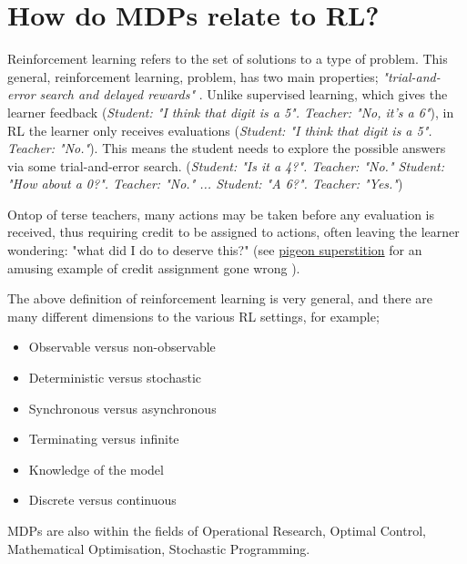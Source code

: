 \hypertarget{how-do-mdps-relate-to-rl}{%
\section{How do MDPs relate to RL?}\label{how-do-mdps-relate-to-rl}}

Reinforcement learning refers to the set of solutions to a type of problem.
This general, reinforcement learning, problem, has two main properties;
\textit{"trial-and-error search and delayed rewards"} \cite{Sutton2018}.
Unlike supervised learning, which gives the learner feedback (\textit{Student: "I think that digit
is a 5". Teacher: "No, it's a 6"}), in RL the learner only receives evaluations (\textit{Student: "I think
that digit is a 5". Teacher: "No."}). This means the student needs to explore the possible answers via some trial-and-error search.
(\textit{Student: "Is it a 4?". Teacher: "No." Student: "How about a 0?". Teacher: "No." ... Student: "A 6?". Teacher: "Yes."})

Ontop of terse teachers, many actions may be taken
before any evaluation is received, thus requiring credit to be assigned to actions,
often leaving the learner wondering: "what did I do to deserve this?" (see
\href{https://www.youtube.com/watch?v=Qv4H81gEGDQ}{pigeon superstition} for an amusing
example of credit assignment gone wrong \cite{Box1997}).


The above definition of reinforcement learning is very general, and there are many
different dimensions to the various RL settings, for example;

\begin{itemize}
\tightlist
\item
  Observable versus non-observable
\item
  Deterministic versus stochastic
\item
  Synchronous versus asynchronous
\item
  Terminating versus infinite
\item
  Knowledge of the model
\item
  Discrete versus continuous
\end{itemize}


MDPs are also within the fields of Operational Research, Optimal Control, Mathematical
Optimisation, Stochastic Programming.



